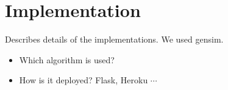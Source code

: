 \chapter{Implementation}
Describes details of the implementations. We used gensim\cite{gensim}.
\begin{itemize}
  \item Which algorithm is used?
  \item How is it deployed? Flask, Heroku $\cdots$
\end{itemize}
